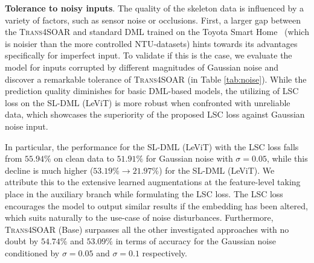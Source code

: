 \documentclass[lettersize,journal]{IEEEtran}
\newcommand{\mypar}[1]{\vspace{0.1cm}\noindent\textbf{#1}.}
\begin{document}
\mypar{Tolerance to noisy inputs}
The quality of the skeleton data is influenced by a variety of factors, such as sensor noise or occlusions. First, a larger gap between the \textsc{Trans4SOAR} and standard DML trained on the Toyota Smart Home~\cite{Das_2019_ICCV} (which is noisier than the more controlled NTU-datasets) hints towards its advantages specifically for imperfect input. To validate if this is the case, we evaluate the model for inputs corrupted by different magnitudes of Gaussian noise and discover a remarkable tolerance of \textsc{Trans4SOAR} (in Table \ref{tab:noise}).
While the prediction quality diminishes for basic DML-based models, the utilizing of LSC loss on the SL-DML (LeViT) is more robust when confronted with unreliable data, which showcases the superiority of the proposed LSC loss against Gaussian noise input. 

In particular, the performance for the SL-DML (LeViT) with the LSC loss falls from $55.94\%$ on clean data to $51.91\%$ for Gaussian noise with $\sigma {=} 0.05$, while this decline is much higher ($53.19\% \rightarrow 21.97\%$) for the SL-DML (LeViT). We attribute this to the extensive learned augmentations at the feature-level taking place in the auxiliary branch while formulating the LSC loss. The LSC loss encourages the model to output similar results if the embedding has been altered, which suits naturally to the use-case of noise disturbances.
Furthermore, \textsc{Trans4SOAR} (Base) surpasses all the other investigated approaches with no doubt by $54.74\%$ and $53.09\%$ in terms of accuracy for the Gaussian noise conditioned by $\sigma {=} 0.05$ and $\sigma {=} 0.1$ respectively.
\end{document}
